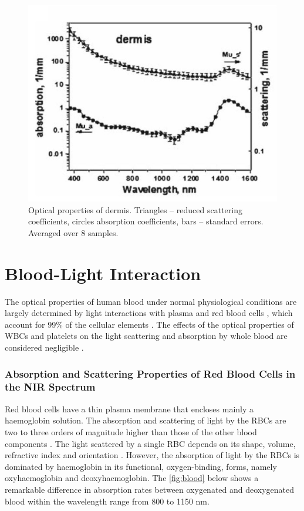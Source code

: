 \begin{figure}[H]
\centering
\includegraphics[scale=0.5]{figures/dermis.JPG}
\caption[Optical properties of dermis]{Optical properties of dermis. Triangles – reduced scattering coefficients,  circles absorption coefficients, bars – standard errors. Averaged over 8 samples.}\label{fig:dermis}
\end{figure}


\section{Blood-Light Interaction}


The optical properties of human blood under normal physiological conditions are largely determined by light interactions with plasma and red blood cells \parencite{opticsOfBlood}, which account for 99\% of the cellular elements \parencite{opticsOfBlood1}. 
The effects of the optical properties of WBCs and platelets on the light scattering and absorption by whole blood are considered negligible \parencite{opticsOfBlood}.

\subsubsection{Absorption and Scattering Properties of Red Blood Cells in the NIR Spectrum}
Red blood cells have a thin plasma membrane that encloses mainly a haemoglobin solution. The absorption and scattering of light by the RBCs are two to three orders of magnitude higher than those of the other blood components \parencite{opticsOfBlood1}. The light scattered by a single RBC depends on
its shape, volume, refractive index and orientation \parencite{opticsOfBlood1}. However, the absorption of light by the RBCs is dominated by haemoglobin in its functional, oxygen-binding, forms, namely oxyhaemoglobin and deoxyhaemoglobin.
The  \autoref{fig:blood} below shows a remarkable difference in absorption rates between oxygenated and deoxygenated blood within the wavelength range from 800 to 1150 nm.


